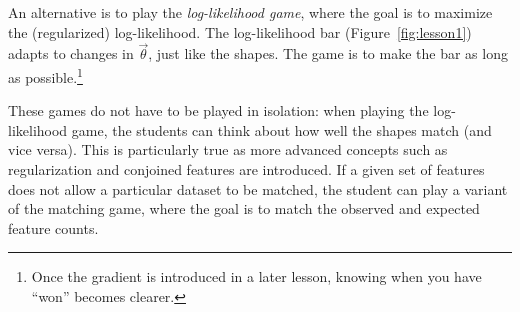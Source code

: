 \documentclass[11pt,letterpaper]{article}
\newcommand{\Note}[1]{}
\renewcommand{\Note}[1]{\hl{[#1]}}  %
\newcommand{\NoteSigned}[3]{{\sethlcolor{#2}\Note{#1: #3}}}
\newcommand{\NoteFF}[1]{\NoteSigned{FF}{LightBlue}{#1}}
\begin{document}
An alternative is to play the \textit{log-likelihood game}, where the goal is to
maximize the (regularized) log-likelihood. The log-likelihood
bar (Figure~\ref{fig:lesson1}) adapts to changes in $\vec{\theta}$,
just like the shapes. The game is to make the bar as 
long as possible.\footnote{Once the gradient is introduced in a later lesson, knowing when you have ``won'' becomes clearer.}

These games do not have to be played in isolation: when playing the log-likelihood game, the 
students can think about how well the shapes match (and vice versa).
This is particularly true as more advanced concepts such as regularization and 
conjoined features are introduced.
If a given set of features does not allow a particular dataset to be matched, 
the student can play a variant of the matching game, where the goal
is to match the observed and expected feature counts. 

\end{document}
